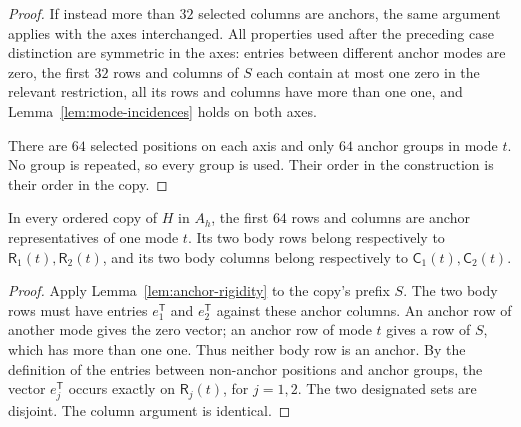 \begin{proof}
If instead more than $32$ selected columns are anchors, the same
argument applies with the axes interchanged. All properties used
after the preceding case distinction are symmetric in the axes:
entries between different anchor modes are zero, the first $32$
rows and columns of $S$ each contain at most one zero in the relevant
restriction, all its rows and columns have more than one one, and
Lemma~\ref{lem:mode-incidences} holds on both axes.

There are $64$ selected positions on each axis and only $64$ anchor
groups in mode $t$. No group is repeated, so every group is used.
Their order in the construction is their order in the copy.
\end{proof}

\begin{corollary}
\label{cor:body-roles}
In every ordered copy of $H$ in $A_h$, the first $64$ rows and
columns are anchor representatives of one mode $t$. Its two body
rows belong respectively to $\mathsf R_1(t),\mathsf R_2(t)$, and its
two body columns belong respectively to
$\mathsf C_1(t),\mathsf C_2(t)$.
\end{corollary}

\begin{proof}
Apply Lemma~\ref{lem:anchor-rigidity} to the copy's prefix $S$.
The two body rows must have entries $e_1^{\mathsf T}$ and
$e_2^{\mathsf T}$ against these anchor columns. An anchor row of
another mode gives the zero vector; an anchor row of mode $t$ gives
a row of $S$, which has more than one one. Thus neither body row is
an anchor. By the definition of the entries between non-anchor
positions and anchor groups, the vector $e_j^{\mathsf T}$ occurs
exactly on $\mathsf R_j(t)$, for $j=1,2$. The two designated sets are
disjoint. The column argument is identical.
\end{proof}
